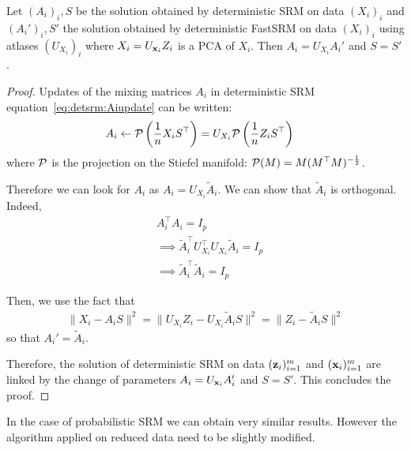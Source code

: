 \documentclass{article}
\begin{document}
\begin{proposition}
  Let $(A_i)_i, S$ be the solution obtained by deterministic SRM on data
  $(X_i)_i$ and $(A_i')_i, S'$ the solution obtained by deterministic FastSRM on
  data $(X_i)_i$ using atlases $(U_{X_i})_i$ where $X_i = U_{\mathbf{x}_i} Z_i$ is a PCA
  of $X_i$.
  Then $A_i = U_{X_i}A_i'$ and $S = S'$.
  
\label{prop:optimaldetsrm}
\end{proposition}
\begin{proof}
Updates of the mixing matrices $A_i$ in deterministic SRM
equation~\eqref{eq:detsrm:Aiupdate} can be written:
\begin{align}
  A_i &\leftarrow \mathcal{P} \left(\frac1{n}X_i S^{\top} \right)= U_{X_i}\mathcal{P} \left(\frac1{n}Z_i S^{\top} \right)
  \label{eq:fastdetsrm:Aiupdate}
\end{align}
where $\mathcal{P}$ is the projection on the Stiefel manifold: $\mathcal{P}(M) = M
(M^{\top}M)^{-\frac12}$.
%

Therefore we can look for $A_i$ as $A_i = U_{X_i} \tilde{A}_i$.
%
We can show that $\tilde{A}_i$ is orthogonal.
%
Indeed,
\begin{align}
  &A_i^{\top} A_i = I_p \\
  & \implies \tilde{A}_i^{\top}U_{X_i}^{\top} U_{X_i} \tilde{A}_i = I_p \\
  & \implies \tilde{A}_i^{\top} \tilde{A}_i = I_p
\end{align}

Then, we use the fact that
\begin{align}
  \|X_i - A_i S \|^2 = \| U_{X_i}Z_i - U_{X_i}\tilde{A}_i S\|^2 = \| Z_i - \tilde{A}_i S \|^2
  \label{eq:equality:xy}
\end{align}
so that $A_i' = \tilde{A}_i$.
%


Therefore, the solution of deterministic SRM on data $(\mathbf{z}_i)_{i=1}^m$ and
$(\mathbf{x}_i)_{i=1}^m$ are linked by the change of parameters $A_i = U_{\mathbf{x}_i}A_i'$ and
$S = S'$.
%
This concludes the proof.
%

\end{proof}

In the case of probabilistic SRM we can obtain very similar results.
%
However the
algorithm applied on reduced data need to be slightly modified.
%
\end{document}
